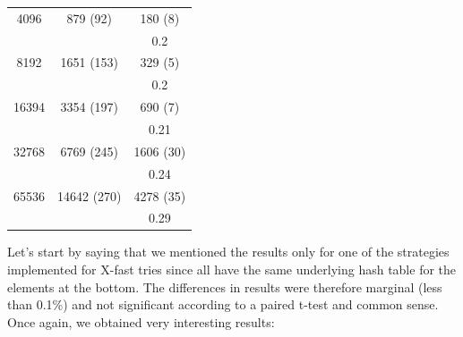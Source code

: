 \begin{table}[!htb]
\begin{minipage}{.5\linewidth}
\begin{tabular}{ccc}
4096          & 879 (92)    & 180 (8)   \\
              &             & 0.2       \\
8192          & 1651 (153)  & 329 (5)   \\
              &             & 0.2       \\
16394         & 3354 (197)  & 690 (7)   \\
              &             & 0.21      \\
32768         & 6769 (245)  & 1606 (30) \\
              &             & 0.24      \\
65536         & 14642 (270) & 4278 (35) \\
              &             & 0.29     
\end{tabular}
    \end{minipage} 
\end{table}

Let's start by saying that we mentioned the results only for one of the strategies implemented for X-fast tries since all have the same underlying hash table for the elements at the bottom. The differences in results were therefore marginal (less than 0.1\%) and not significant according to a paired t-test and common sense.
Once again, we obtained very interesting results:

